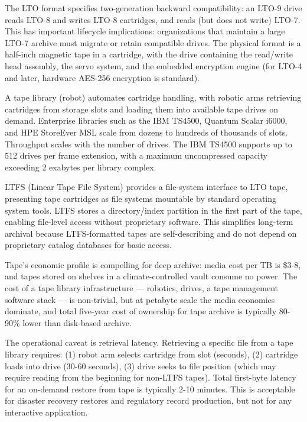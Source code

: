 The LTO format specifies two-generation backward compatibility: an LTO-9 drive reads LTO-8 and writes LTO-8 cartridges, and reads (but does not write) LTO-7. This has important lifecycle implications: organizations that maintain a large LTO-7 archive must migrate or retain compatible drives. The physical format is a half-inch magnetic tape in a cartridge, with the drive containing the read/write head assembly, the servo system, and the embedded encryption engine (for LTO-4 and later, hardware AES-256 encryption is standard).

A tape library (robot) automates cartridge handling, with robotic arms retrieving cartridges from storage slots and loading them into available tape drives on demand. Enterprise libraries such as the IBM TS4500, Quantum Scalar i6000, and HPE StoreEver MSL scale from dozens to hundreds of thousands of slots. Throughput scales with the number of drives. The IBM TS4500 supports up to 512 drives per frame extension, with a maximum uncompressed capacity exceeding 2 exabytes per library complex.

LTFS (Linear Tape File System) provides a file-system interface to LTO tape, presenting tape cartridges as file systems mountable by standard operating system tools. LTFS stores a directory/index partition in the first part of the tape, enabling file-level access without proprietary software. This simplifies long-term archival because LTFS-formatted tapes are self-describing and do not depend on proprietary catalog databases for basic access.

Tape's economic profile is compelling for deep archive: media cost per TB is \$3-8, and tapes stored on shelves in a climate-controlled vault consume no power. The cost of a tape library infrastructure --- robotics, drives, a tape management software stack --- is non-trivial, but at petabyte scale the media economics dominate, and total five-year cost of ownership for tape archive is typically 80-90\% lower than disk-based archive.

The operational caveat is retrieval latency. Retrieving a specific file from a tape library requires: (1) robot arm selects cartridge from slot (seconds), (2) cartridge loads into drive (30-60 seconds), (3) drive seeks to file position (which may require reading from the beginning for non-LTFS tapes). Total first-byte latency for an on-demand restore from tape is typically 2-10 minutes. This is acceptable for disaster recovery restores and regulatory record production, but not for any interactive application.

